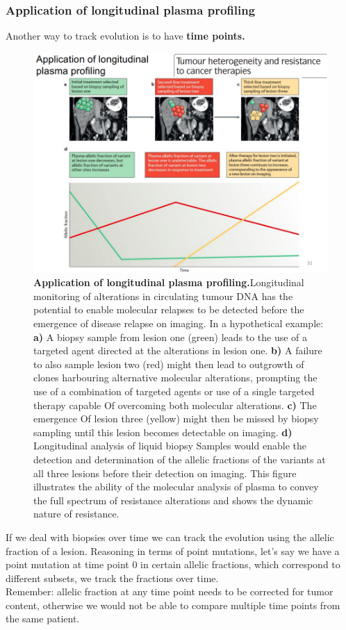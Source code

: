 \subsubsection{Application of longitudinal plasma profiling}
Another way to track evolution is to have \textbf{time points.}
\begin{figure}[H]
\centering
\includegraphics[width=0.8\linewidth]{image16.png}
\caption{\textbf{Application of longitudinal plasma profiling.}Longitudinal monitoring of alterations in circulating tumour DNA has the potential to enable molecular relapses to be detected before the emergence of disease relapse on imaging. In a hypothetical example: \textbf{a)} A biopsy sample from lesion one (green) leads to the use of a targeted agent directed at the alterations in lesion one. \textbf{b)} A failure to also sample lesion two (red) might then lead to outgrowth of clones harbouring alternative molecular alterations, prompting the use of a combination of targeted agents or use of a single targeted therapy capable Of overcoming both molecular alterations. \textbf{c)} The emergence Of lesion three (yellow) might then be
missed by biopsy sampling until this lesion becomes detectable on imaging. \textbf{d)} Longitudinal analysis of liquid biopsy
Samples would enable the detection and determination of the allelic fractions of the variants at all three lesions before their detection on imaging. This figure illustrates the ability of the molecular analysis of plasma to convey the full spectrum of resistance alterations and shows the dynamic nature of resistance.}
\label{fig:img16}
\end{figure}

If we deal with biopsies over time we can track the evolution using the allelic fraction of a lesion.
Reasoning in terms of point mutations, let's say we have a point mutation at time point 0 in certain allelic fractions, which correspond to different subsets, we track the fractions over time.
\\
Remember: allelic fraction at any time point needs to be corrected for tumor content, otherwise we would not be able to compare multiple time points from the same patient.
